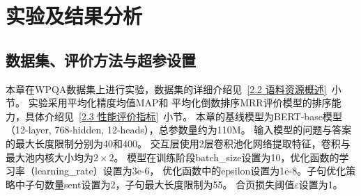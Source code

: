 
\section{实验及结果分析}

\subsection{数据集、评价方法与超参设置}
本章在WPQA数据集上进行实验，数据集的详细介绍见~\ref{2.2 语料资源概述}~小节。
实验采用平均化精度均值MAP和
平均化倒数排序MRR评价模型的排序能力，具体介绍见~\ref{2.3 性能评价指标}~小节。
本章的基线模型为BERT-base模型（12-layer, 768-hidden, 12-heads），总参数量约为110M。
输入模型的问题与答案的最大长度限制分别为40和400。
交互层使用2层卷积池化网络提取特征，卷积与最大池内核大小均为$2\times2$。
模型在训练阶段batch\_size设置为10，优化函数的学习率（learning\_rate）设置为3e-6，
优化函数中的epsilon\cite{rutherford2002lecture}设置为1e-8。子句优化策略中子句数量sent设置为2，子句最大长度限制为55。
合页损失阈值$\varepsilon$设置为1。

